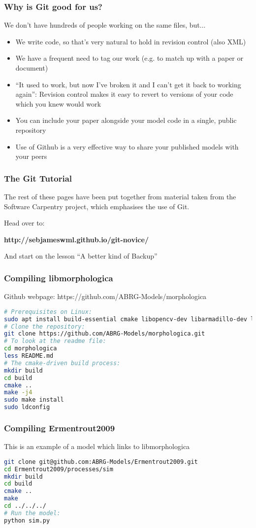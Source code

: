 \documentclass{beamer}
\begin{document}
\begin{frame}
  \frametitle{Why is Git good for us?}
  We don't have hundreds of people working on the same files, but...
  \begin{itemize}
    \pause \item We write code, so that's very natural to hold in
    revision control (also XML)
    \pause \item We have a frequent need to \alert{tag} our work (e.g. to
    match up with a paper or document)
    \pause \item ``It used to work, but now I've broken it and I can't
    get it back to working again'': Revision control makes it easy to
    revert to versions of your code which you knew would work
    \pause \item You can include your paper alongside your model code
    in a single, public repository
    \pause \item Use of Github is a very effective way to share your
    published models with your peers
  \end{itemize}
\end{frame}

\begin{frame}
  \frametitle{The Git Tutorial}
  The rest of these pages have been put together from material taken
  from the Software Carpentry project, which emphasises the use of
  Git.

  Head over to:

  \textbf{http://sebjameswml.github.io/git-novice/}

  And start on the lesson ``A better kind of Backup''

\end{frame}

\begin{frame}[fragile]
  \frametitle{Compiling libmorphologica}
    Github webpage: https://github.com/ABRG-Models/morphologica

  \begin{lstlisting}[language=bash]
# Prerequisites on Linux:
sudo apt install build-essential cmake libopencv-dev libarmadillo-dev libglu1-mesa-dev libxmu-dev libxi-dev
# Clone the repository:
git clone https://github.com/ABRG-Models/morphologica.git
# To look at the readme file:
cd morphologica
less README.md
# The cmake-driven build process:
mkdir build
cd build
cmake ..
make -j4
sudo make install
sudo ldconfig\end{lstlisting}
\end{frame}

\begin{frame}[fragile]
  \frametitle{Compiling Ermentrout2009}
  This is an example of a model which links to libmorphologica
  \begin{lstlisting}[language=bash]
git clone git@github.com:ABRG-Models/Ermentrout2009.git
cd Ermentrout2009/processes/sim
mkdir build
cd build
cmake ..
make
cd ../../../
# Run the model:
python sim.py\end{lstlisting}
\end{frame}
\end{document}
